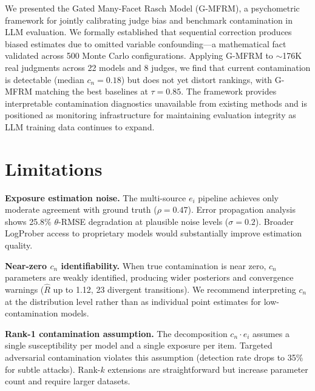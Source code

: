 \documentclass[11pt]{article}
\newcommand{\gmfrm}{G-MFRM}
\newcommand{\cn}{c_n}
\newcommand{\ei}{e_i}
\begin{document}
We presented the Gated Many-Facet Rasch Model (\gmfrm{}), a psychometric framework for jointly calibrating judge bias and benchmark contamination in LLM evaluation. We formally established that sequential correction produces biased estimates due to omitted variable confounding---a mathematical fact validated across 500 Monte Carlo configurations. Applying \gmfrm{} to ${\sim}$176K real judgments across 22 models and 8 judges, we find that current contamination is detectable (median $\cn = 0.18$) but does not yet distort rankings, with \gmfrm{} matching the best baselines at $\tau = 0.85$. The framework provides interpretable contamination diagnostics unavailable from existing methods and is positioned as monitoring infrastructure for maintaining evaluation integrity as LLM training data continues to expand.

\section*{Limitations}
\label{sec:limitations}

\textbf{Exposure estimation noise.} The multi-source $\ei$ pipeline achieves only moderate agreement with ground truth ($\rho = 0.47$). Error propagation analysis shows 25.8\% $\theta$-RMSE degradation at plausible noise levels ($\sigma = 0.2$). Broader LogProber access to proprietary models would substantially improve estimation quality.

\textbf{Near-zero $\cn$ identifiability.} When true contamination is near zero, $\cn$ parameters are weakly identified, producing wider posteriors and convergence warnings ($\hat{R}$ up to 1.12, 23 divergent transitions). We recommend interpreting $\cn$ at the distribution level rather than as individual point estimates for low-contamination models.

\textbf{Rank-1 contamination assumption.} The decomposition $\cn \cdot \ei$ assumes a single susceptibility per model and a single exposure per item. Targeted adversarial contamination violates this assumption (detection rate drops to 35\% for subtle attacks). Rank-$k$ extensions are straightforward but increase parameter count and require larger datasets.



\end{document}
